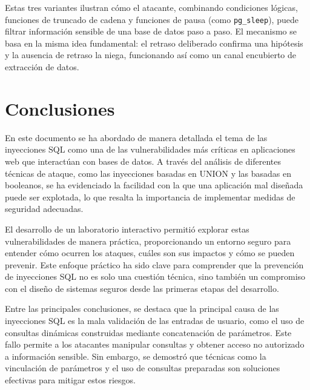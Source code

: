 \documentclass[a4paper,12pt]{article}
\begin{document}
\medskip

Estas tres variantes ilustran cómo el atacante, combinando condiciones lógicas, funciones de truncado de cadena y funciones de pausa (como \texttt{pg\_sleep}), puede filtrar información sensible de una base de datos paso a paso. El mecanismo se basa en la misma idea fundamental: el retraso deliberado confirma una hipótesis y la ausencia de retraso la niega, funcionando así como un canal encubierto de extracción de datos.





\section{Conclusiones}

En este documento se ha abordado de manera detallada el tema de las inyecciones SQL como una de las vulnerabilidades más críticas en aplicaciones web que interactúan con bases de datos. A través del análisis de diferentes técnicas de ataque, como las inyecciones basadas en UNION y las basadas en booleanos, se ha evidenciado la facilidad con la que una aplicación mal diseñada puede ser explotada, lo que resalta la importancia de implementar medidas de seguridad adecuadas.

\vspace{0,5cm}

El desarrollo de un laboratorio interactivo permitió explorar estas vulnerabilidades de manera práctica, proporcionando un entorno seguro para entender cómo ocurren los ataques, cuáles son sus impactos y cómo se pueden prevenir. Este enfoque práctico ha sido clave para comprender que la prevención de inyecciones SQL no es solo una cuestión técnica, sino también un compromiso con el diseño de sistemas seguros desde las primeras etapas del desarrollo.

\vspace{0,5cm}

Entre las principales conclusiones, se destaca que la principal causa de las inyecciones SQL es la mala validación de las entradas de usuario, como el uso de consultas dinámicas construidas mediante concatenación de parámetros. Este fallo permite a los atacantes manipular consultas y obtener acceso no autorizado a información sensible. Sin embargo, se demostró que técnicas como la vinculación de parámetros y el uso de consultas preparadas son soluciones efectivas para mitigar estos riesgos.
\end{document}
